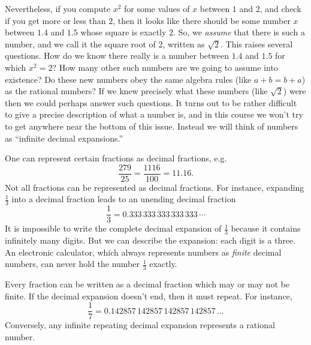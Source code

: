 Nevertheless, if you compute $x^2$ for some values of $x$ between $1$ and $2$,
and check if you get more or less than $2$, then it looks like there should be
some number $x$ between $1.4$ and $1.5$ whose square is exactly $2$.  So, we
\textit{assume} that there is such a number, and we call it the square root of
2, written as $\sqrt2$.  This raises several questions.  How do we know there
really is a number between $1.4$ and $1.5$ for which $x^2=2$?  How many other
such numbers are we going to assume into existence?  Do these new numbers obey
the same algebra rules (like $a+b = b+a$) as the rational numbers?   If we
knew precisely what these numbers (like $\sqrt2$) were then we could perhaps
answer such questions.  It turns out to be rather difficult to give a precise
description of what a number is, and in this course we won't try to get
anywhere near the bottom of this issue.  Instead we will think of numbers as
``infinite decimal expansions.''

One can represent certain fractions as decimal fractions, e.g.
\[
\frac{279}{25}= \frac{1116}{100} = 11.16.
\]
Not all fractions can be represented as decimal fractions.  For instance,
expanding $\frac13$ into a decimal fraction leads to an unending decimal
fraction
\[
\frac13 = 0.333\,333\,333\,333\,333\,\cdots
\]
It is impossible to write the complete decimal expansion of $\frac13$
because it contains infinitely many digits.  But we can describe the
expansion: each digit is a three. An electronic calculator, which
always represents numbers as \emph{finite} decimal numbers, can never
hold the number $\frac13$ exactly.

Every fraction can be written as a decimal fraction which may or may
not be finite.  If the decimal expansion doesn't end, then it must
repeat.  For instance,
\[
\frac17 = 0.142857\,142857\,142857\,142857\,\dots
\]
Conversely, any infinite repeating decimal expansion represents a
rational number.

